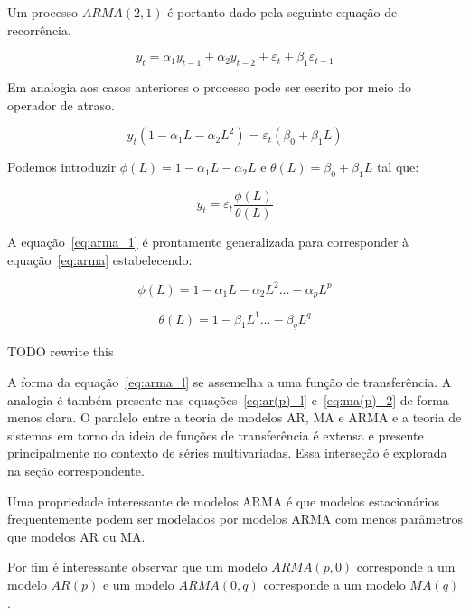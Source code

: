 Um processo $ARMA(2, 1)$ é portanto dado pela seguinte equação de recorrência.

$$ y_t = \alpha_1 y_{t-1} + \alpha_2 y_{t-2} + \varepsilon_{t} + \beta_1 \varepsilon_{t-1} $$

Em analogia aos casos anteriores o processo pode ser escrito por meio do
operador de atraso.

$$ y_t (1 - \alpha_1 L - \alpha_2 L^2) = \varepsilon_{t} (\beta_0 + \beta_1 L) $$

Podemos introduzir $\phi(L) = 1 - \alpha_1 L - \alpha_2 L$ e $\theta(L) =
\beta_0 + \beta_1 L$ tal que:

\begin{equation}\label{eq:arma_l}
    y_t = \varepsilon_t \frac{\phi(L)}{\theta(L)}
\end{equation}

A equação~\ref{eq:arma_1} é prontamente generalizada para corresponder à
equação~\ref{eq:arma} estabelecendo:

$$\phi(L) = 1 - \alpha_1 L - \alpha_2 L^2 \hdots - \alpha_p L^p$$

$$\theta(L) = 1 - \beta_1 L^1 \hdots - \beta_q L^q$$

TODO rewrite this

A forma da equação~\ref{eq:arma_l} se assemelha a uma função de transferência.
A analogia é também presente nas equações~\ref{eq:ar(p)_l} e~\ref{eq:ma(p)_2}
de forma menos clara. O paralelo entre a teoria de modelos AR, MA e ARMA e a
teoria de sistemas em torno da ideia de funções de transferência é extensa
e presente principalmente no contexto de séries multivariadas. Essa
interseção é explorada na seção correspondente.


Uma propriedade interessante de modelos ARMA é que modelos estacionários
frequentemente podem ser modelados por modelos ARMA com menos parâmetros que
modelos AR ou MA.

Por fim é interessante observar que um modelo $ARMA(p, 0)$ corresponde
a um modelo $AR(p)$ e um modelo $ARMA(0, q)$ corresponde a um modelo
$MA(q)$.



